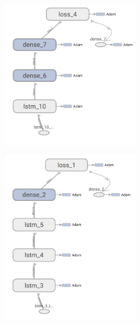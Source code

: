 \begin{figure}
\begin{subfigure}[b]{0.3\linewidth}
\begin{subfigure}[b]{\linewidth}
			\includegraphics[width=\linewidth]{plots/rnn-candidates-1-lstm-2-dense.png}
		\end{subfigure}
	\end{subfigure}
	\begin{subfigure}[b]{0.3\linewidth}
		\begin{subfigure}[b]{\linewidth}
			\includegraphics[width=\linewidth]{plots/rnn-candidates-3-lstm-1-dense.png}

\end{subfigure}
\end{subfigure}
\end{figure}
